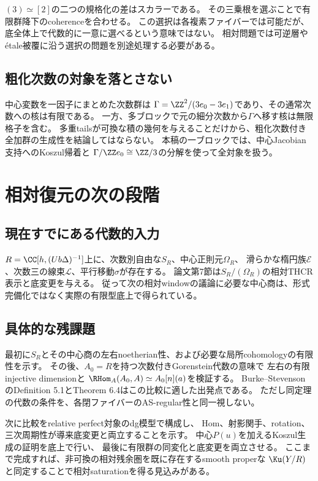 $(3)\simeq[2]$の二つの規格化の差はスカラーである。
その三乗根を選ぶことで有限群降下のcoherenceを合わせる。
この選択は各複素ファイバーでは可能だが、底全体上で代数的に一意に選べるという意味ではない。
相対問題では可逆層やétale被覆に沿う選択の問題を別途処理する必要がある。

\subsection{粗化次数の対象を落とさない}
中心変数を一因子にまとめた次数群は
$\Gamma=\ZZ^2/(3e_0-3e_1)$であり、その通常次数への核は有限である。
一方、多ブロックで元の細分次数から$\Gamma$へ移す核は無限格子を含む。
多重tailsが可換な積の幾何を与えることだけから、粗化次数付き全加群の生成性を結論してはならない。
本稿の一ブロックでは、中心Jacobian支持へのKoszul帰着と
$\Gamma/\ZZ e_0\cong\ZZ/3$の分解を使って全対象を扱う。

\section{相対復元の次の段階}
\subsection{現在すでにある代数的入力}
$R=\CC[h,(Ub\Delta)^{-1}]$上に、次数別自由な$S_R$、中心正則元$\Omega_R$、
滑らかな楕円族$\mathscr E$、次数三の線束$\mathcal L$、平行移動$\sigma$が存在する。
論文第7節は$S_R/(\Omega_R)$の相対THCR表示と底変更を与える。
従って次の相対windowの議論に必要な中心商は、形式完備化ではなく実際の有限型底上で得られている。

\subsection{具体的な残課題}
最初に$S_R$とその中心商の左右noetherian性、および必要な局所cohomologyの有限性を示す。
その後、$A_0=R$を持つ次数付きGorenstein代数の意味で
左右の有限injective dimensionと
$\RHom_A(A_0,A)\simeq A_0[n](a)$を検証する。
Burke--StevensonのDefinition 5.1とTheorem 6.4はこの比較に適した出発点である。
ただし同定理の代数の条件を、各閉ファイバーのAS-regular性と同一視しない。

次に比較をrelative perfect対象のdg模型で構成し、
Hom、射影関手、rotation、三次周期性が導来底変更と両立することを示す。
中心$P(u)$を加えるKoszul生成の証明を底上で行い、
最後に有限群の同変化と底変更を両立させる。
ここまで完成すれば、非可換の相対残余圏を既に存在するsmooth properな
$\Ku(Y/R)$と同定することで相対saturationを得る見込みがある。

